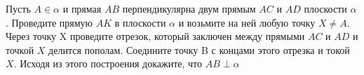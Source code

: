 Пусть $A\in\alpha$ и прямая $AB$ перпендикулярна двум прямым $AC$ и $AD$ плоскости $\alpha$. Проведите прямую $AK$ в плоскости $\alpha$ и возьмите на ней любую точку $X\neq A$. Через точку X проведите отрезок, который заключен между прямыми $AC$ и $AD$ и точкой $X$ делится пополам. Соедините точку B с концами этого отрезка и токой $X$. Исходя из этого построения докажите, что $AB\perp\alpha$ 